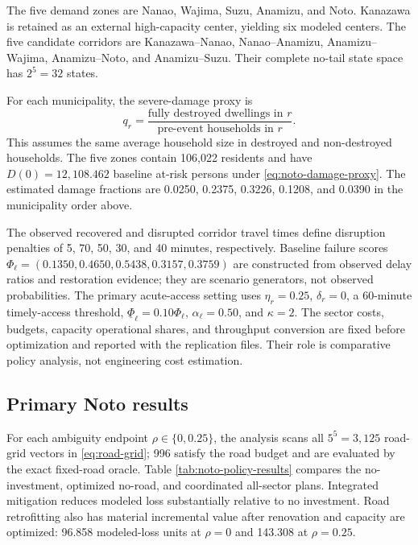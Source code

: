 The five demand zones are Nanao, Wajima, Suzu, Anamizu, and Noto. Kanazawa
is retained as an external high-capacity center, yielding six modeled
centers. The five candidate corridors are Kanazawa--Nanao,
Nanao--Anamizu, Anamizu--Wajima, Anamizu--Noto, and Anamizu--Suzu. Their
complete no-tail state space has \(2^5=32\) states.

For each municipality, the severe-damage proxy is
\begin{equation}
 q_r=\frac{\text{fully destroyed dwellings in }r}
             {\text{pre-event households in }r}.
\label{eq:noto-damage-proxy}
\end{equation}
This assumes the same average household size in destroyed and non-destroyed
households. The five zones contain 106,022 residents and have
\(D(0)=12{,}108.462\) baseline at-risk persons under
\eqref{eq:noto-damage-proxy}. The estimated damage fractions are 0.0250,
0.2375, 0.3226, 0.1208, and 0.0390 in the municipality order above.

The observed recovered and disrupted corridor travel times define disruption
penalties of 5, 70, 50, 30, and 40 minutes, respectively. Baseline failure
scores \(\Phi_\ell=(0.1350,0.4650,0.5438,0.3157,0.3759)\) are constructed
from observed delay ratios and restoration evidence; they are scenario
generators, not observed probabilities. The primary acute-access setting
uses \(\eta_r=0.25\), \(\delta_r=0\), a 60-minute timely-access threshold,
\(\underline\Phi_\ell=0.10\Phi_\ell\), \(\alpha_\ell=0.50\), and
\(\kappa=2\). The sector costs, budgets, capacity operational shares, and
throughput conversion are fixed before optimization and reported with the
replication files. Their role is comparative policy analysis, not
engineering cost estimation.

\subsection{Primary Noto results}
\label{sec:noto-results}

For each ambiguity endpoint \(\rho\in\{0,0.25\}\), the analysis scans all
\(5^5=3{,}125\) road-grid vectors in \eqref{eq:road-grid}; 996 satisfy the
road budget and are evaluated by the exact fixed-road oracle. Table
\ref{tab:noto-policy-results} compares the no-investment, optimized
no-road, and coordinated all-sector plans. Integrated mitigation reduces
modeled loss substantially relative to no investment. Road retrofitting also
has material incremental value after renovation and capacity are optimized:
96.858 modeled-loss units at \(\rho=0\) and 143.308 at \(\rho=0.25\).

